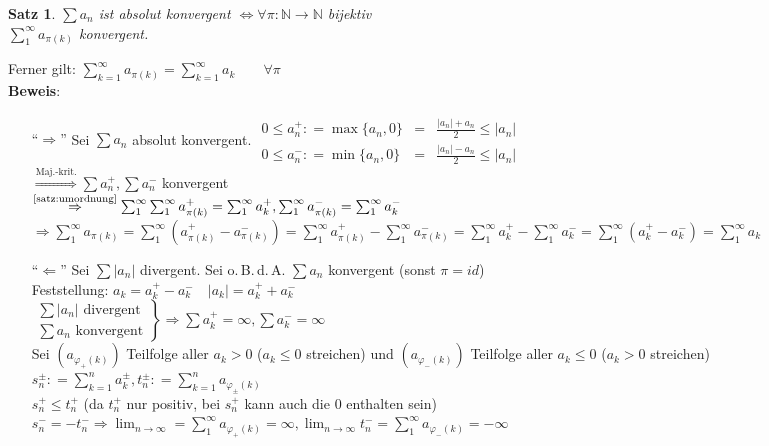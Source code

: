 \documentclass[ngerman,titlepage,twoside, parskip=half*]{scrreprt}
\newcommand*{\N}{\mathbb{N}}
\theoremstyle{plain}
\newtheorem{theorem}{Satz}[section]
\theoremstyle{definition}
\theoremstyle{remark}
\newcommand*{\abs}[2][]{#1\lvert#2#1\rvert}
\newcommand*{\coloneqq}{\mathrel{\mathop:}=}
\begin{document}
\begin{theorem}
\label{satz:absUmordnung}
$\sum a_n$ ist absolut konvergent $\Leftrightarrow \forall \pi \colon\N \rightarrow \N$ bijektiv\\
$\sum_1^\infty a_{\pi(k)}$ konvergent.
\end{theorem}
Ferner gilt: $\sum_{k=1}^\infty a_{\pi(k)}=\sum_{k=1}^\infty a_k \qquad \forall \pi$\\
\textbf{Beweis}:
\begin{itemize}
  \item["`$\Rightarrow$"'] Sei $\sum a_n$ absolut konvergent.
    $\begin{array}{rcl}
      0\leq a_n^+\coloneqq\max\{a_n,0\} & = & \frac{\abs{a_n}+a_n}{2}\leq \abs{a_n}\\
      0\leq a_n^-\coloneqq\min\{a_n,0\} & = & \frac{\abs{a_n}-a_n}{2}\leq \abs{a_n}
    \end{array}$\\
    $\stackrel{\text{Maj.-krit.}}{\Rightarrow} \sum a_n^+, \sum a_n^-$ konvergent\\
    $\stackrel{\text{\autoref{satz:umordnung}}}{\Rightarrow} \sum_1^\infty \sum_1^\infty a_{\pi(k)}^+=\sum_1^\infty a_k^+,
    \sum_1^\infty a_{\pi(k)}^-=\sum_1^\infty a_k^-$\\
    $\Rightarrow \sum_1^\infty a_{\pi(k)}=\sum_1^\infty (a_{\pi(k)}^+-a_{\pi(k)}^-)=\sum_1^\infty a_{\pi(k)}^+-
    \sum_1^\infty a_{\pi(k)}^- =\sum_1^\infty a_k^+ -\sum_1^\infty a_k^-
  =\sum_1^\infty (a_k^+ -a_k^-)=\sum_1^\infty a_k$
  \item["`$\Leftarrow$"'] Sei $\sum \abs{a_n}$ divergent. Sei o.\,B.\,d.\,A. $\sum a_n$ konvergent (sonst $\pi=id$)\\
    Feststellung: $a_k=a_k^+-a_k^- \quad \abs{a_k}=a_k^++a_k^-$\\
    $\left.\begin{array}{rcl}
      \sum \abs{a_n} \text{ divergent}\\
      \sum a_n \text{ konvergent}
    \end{array}\right\}\Rightarrow \sum a_k^+=\infty, \sum a_k^-=\infty$\\
    Sei $(a_{\varphi_+(k)})$ Teilfolge aller $a_k>0$ ($a_k\leq 0$ streichen) und $(a_{\varphi_-(k)})$ Teilfolge aller
    $a_k\leq 0$ ($a_k>0$ streichen)\\
    $s_n^\pm\coloneqq\sum_{k=1}^n a_k^\pm, t_n^\pm\coloneqq\sum_{k=1}^n
  a_{\varphi_\pm(k)}$\\
    $s_n^+\leq t_n^+$ (da $t_n^+$ nur positiv, bei $s_n^+$ kann auch die 0 enthalten sein)\\
    $s_n^-=-t_n^- \Rightarrow \lim_{n\rightarrow \infty}=\sum_1^\infty a_{\varphi_+(k)}=\infty, \lim_{n\rightarrow \infty}
    t_n^-=\sum_1^\infty a_{\varphi_-(k)}=-\infty$ %
\end{itemize}
\end{document}
